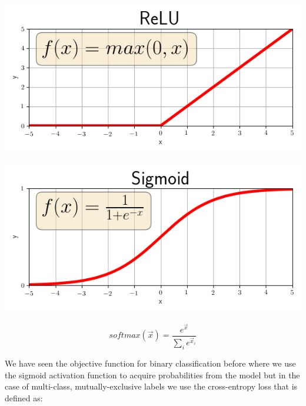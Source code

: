 \documentclass[a4paper,12pt]{article}
\begin{document}
\vspace{7mm}

\begin{minipage}[t]{0.45\textwidth}
    \centering
    \includegraphics[width=\textwidth]{relu.png}
    \label{fig:relu}
\end{minipage}
\begin{minipage}[t]{0.45\textwidth}
    \centering
    \includegraphics[width=\textwidth]{sigmoid.png}
    \label{fig:sigmoid}
\end{minipage}

\vspace{4mm}

\begin{equation}
    softmax(\vec{x}) = \frac{e^{\vec{x}}}{\sum_{i}e^{\vec{x}_i}}
\end{equation}

\vspace{4mm}

\par We have seen the objective function for binary classification before where we use the sigmoid activation function to acquire probabilities from the model but in the case of multi-class, mutually-exclusive labels we use the cross-entropy loss that is defined as:
\end{document}
